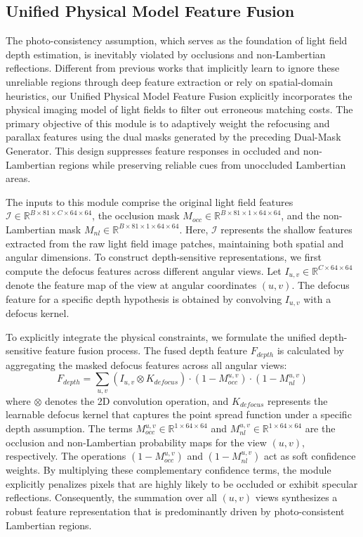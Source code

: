 \documentclass[lettersize,journal]{IEEEtran}
\begin{document}
\subsection{Unified Physical Model Feature Fusion}

The photo-consistency assumption, which serves as the foundation of light field depth estimation, is inevitably violated by occlusions and non-Lambertian reflections. Different from previous works that implicitly learn to ignore these unreliable regions through deep feature extraction or rely on spatial-domain heuristics, our Unified Physical Model Feature Fusion explicitly incorporates the physical imaging model of light fields to filter out erroneous matching costs. The primary objective of this module is to adaptively weight the refocusing and parallax features using the dual masks generated by the preceding Dual-Mask Generator. This design suppresses feature responses in occluded and non-Lambertian regions while preserving reliable cues from unoccluded Lambertian areas.

The inputs to this module comprise the original light field features $\mathcal{I} \in \mathbb{R}^{B \times 81 \times C \times 64 \times 64}$, the occlusion mask $M_{occ} \in \mathbb{R}^{B \times 81 \times 1 \times 64 \times 64}$, and the non-Lambertian mask $M_{nl} \in \mathbb{R}^{B \times 81 \times 1 \times 64 \times 64}$. Here, $\mathcal{I}$ represents the shallow features extracted from the raw light field image patches, maintaining both spatial and angular dimensions. To construct depth-sensitive representations, we first compute the defocus features across different angular views. Let $I_{u,v} \in \mathbb{R}^{C \times 64 \times 64}$ denote the feature map of the view at angular coordinates $(u,v)$. The defocus feature for a specific depth hypothesis is obtained by convolving $I_{u,v}$ with a defocus kernel.

To explicitly integrate the physical constraints, we formulate the unified depth-sensitive feature fusion process. The fused depth feature $F_{depth}$ is calculated by aggregating the masked defocus features across all angular views:
\begin{equation}
\label{eq:eq8}
F_{depth} = \sum_{u,v} (I_{u,v} \otimes K_{defocus}) \cdot (1 - M_{occ}^{u,v}) \cdot (1 - M_{nl}^{u,v})
\end{equation}
where $\otimes$ denotes the 2D convolution operation, and $K_{defocus}$ represents the learnable defocus kernel that captures the point spread function under a specific depth assumption. The terms $M_{occ}^{u,v} \in \mathbb{R}^{1 \times 64 \times 64}$ and $M_{nl}^{u,v} \in \mathbb{R}^{1 \times 64 \times 64}$ are the occlusion and non-Lambertian probability maps for the view $(u,v)$, respectively. The operations $(1 - M_{occ}^{u,v})$ and $(1 - M_{nl}^{u,v})$ act as soft confidence weights. By multiplying these complementary confidence terms, the module explicitly penalizes pixels that are highly likely to be occluded or exhibit specular reflections. Consequently, the summation over all $(u,v)$ views synthesizes a robust feature representation that is predominantly driven by photo-consistent Lambertian regions.
\end{document}
